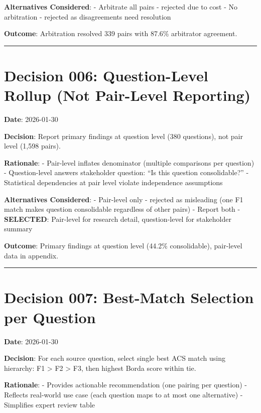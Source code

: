 \documentclass[
  letterpaper,
]{report}
\begin{document}
\textbf{Alternatives Considered}: - Arbitrate all pairs - rejected due
to cost - No arbitration - rejected as disagreements need resolution

\textbf{Outcome}: Arbitration resolved 339 pairs with 87.6\% arbitrator
agreement.

\begin{center}\rule{0.5\linewidth}{0.5pt}\end{center}

\section{Decision 006: Question-Level Rollup (Not Pair-Level
Reporting)}\label{decision-006-question-level-rollup-not-pair-level-reporting}

\textbf{Date}: 2026-01-30

\textbf{Decision}: Report primary findings at question level (380
questions), not pair level (1,598 pairs).

\textbf{Rationale}: - Pair-level inflates denominator (multiple
comparisons per question) - Question-level answers stakeholder question:
``Is this question consolidable?'' - Statistical dependencies at pair
level violate independence assumptions

\textbf{Alternatives Considered}: - Pair-level only - rejected as
misleading (one F1 match makes question consolidable regardless of other
pairs) - Report both - \textbf{SELECTED}: Pair-level for research
detail, question-level for stakeholder summary

\textbf{Outcome}: Primary findings at question level (44.2\%
consolidable), pair-level data in appendix.

\begin{center}\rule{0.5\linewidth}{0.5pt}\end{center}

\section{Decision 007: Best-Match Selection per
Question}\label{decision-007-best-match-selection-per-question}

\textbf{Date}: 2026-01-30

\textbf{Decision}: For each source question, select single best ACS
match using hierarchy: F1 \textgreater{} F2 \textgreater{} F3, then
highest Borda score within tie.

\textbf{Rationale}: - Provides actionable recommendation (one pairing
per question) - Reflects real-world use case (each question maps to at
most one alternative) - Simplifies expert review table
\end{document}
